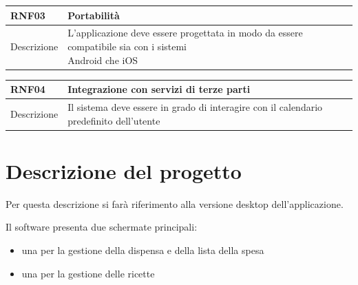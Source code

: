 \documentclass{article}
\begin{document}
\begin{table}[H]
  \begin{flushleft}
    \begin{tabular}{l|l}
      \toprule
      \textbf{RNF03} & \textbf{Portabilità}\\
      \midrule
      Descrizione & \makecell{L'applicazione deve essere progettata in modo da essere compatibile sia con i sistemi \\ Android che iOS}\\
      \bottomrule
    \end{tabular}
  \end{flushleft}
\end{table}

\begin{table}[H]
  \begin{flushleft}
    \begin{tabular}{l|l}
      \toprule
      \textbf{RNF04} & \textbf{Integrazione con servizi di terze parti}\\
      \midrule
      Descrizione & Il sistema deve essere in grado di interagire con il calendario predefinito dell'utente\\
      \bottomrule
    \end{tabular}
  \end{flushleft}
\end{table}

\section{Descrizione del progetto}

Per questa descrizione si farà riferimento alla versione desktop dell'applicazione.

Il software presenta due schermate principali:

\begin{itemize}

  \item una per la gestione della dispensa e della lista della spesa
  \item una per la gestione delle ricette

\end{itemize}
\end{document}
